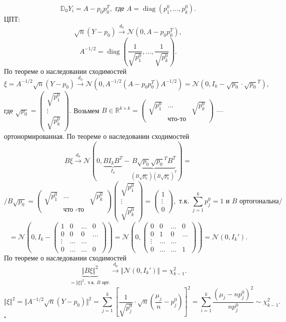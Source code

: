 \documentclass[12pt]{report}
\DeclareMathOperator{\diag}{diag}
\renewenvironment{proof}{{\bfseries Доказательство:}}{$\square$\\\\}
\theoremstyle{definition}
\begin{document}
\begin{proof}
	$$\mathbb{D}_0 Y_i = A - p_0p_0^T, \text{ где } A = \diag(p_1^0, \ldots, p_k^0).$$
	ЦПТ:
	$$\sqrt{n}(Y - p_0) \xrightarrow{d_0} \mathcal{N}(0, A - p_0p_0^T),$$
	$$A^{-1/2} = \diag\left(\dfrac{1}{\sqrt{p_1^0}}, \ldots, \dfrac{1}{\sqrt{p_k^0}} \right).$$
	По теореме о наследовании сходимостей
	$$\xi = A^{-1/2}\sqrt{n}(Y - p_0) \xrightarrow{d_0} \mathcal{N}(0, A^{-1/2}(A - p_0p_0^T)A^{-1/2}) = \mathcal{N}(0, I_k - \sqrt{p_0}\cdot\sqrt{p_0}^T),$$
	где $\sqrt{p_0} = \begin{pmatrix}
		\sqrt{p_1^0} \\
		\vdots \\
		\sqrt{p_k^0}
	\end{pmatrix}.$ Возьмем $B \in \mathbb{R}^{k \times k} = \begin{pmatrix}
		\sqrt{p_1^0} & \ldots & \sqrt{p_k^0}\\
		& \text{что-то} &
	\end{pmatrix}$ — ортонормированная. По теореме о наследовании сходимостей
	$$B\xi \xrightarrow{d_0} \mathcal{N}(0, \underbrace{BI_kB^T}_{I_k} - \underbrace{B\sqrt{p_0}\sqrt{p_0}^TB^T}_{(B\sqrt{p_0})(B\sqrt{p_0})^T}) = $$
	$$/ B\sqrt{p_0} = \begin{pmatrix}
		\sqrt{p_1^0} & \ldots & \sqrt{p_k^0}\\
		& \text{что -то} &
	\end{pmatrix}\begin{pmatrix}
		\sqrt{p_1^0} \\
		\vdots \\
		\sqrt{p_k^0}
	\end{pmatrix} =
	\begin{pmatrix}
		1 \\
		\vdots \\
		0
	\end{pmatrix}, \text{ т.к. } \displaystyle{\sum_{j=1}^k}p_j^0 = 1\text{ и } B \text{ ортогональна}/$$
	$$= 
	\mathcal{N}\left(0, I_k - \begin{pmatrix}
		1 & 0 & \ldots & 0 \\
		0 & 0 & 0 & \ldots \\
		\vdots & \dots & \dots & \\
		0 & \dots & \dots & 0
	\end{pmatrix}\right) = 
	\mathcal{N}\left(0,  \begin{pmatrix}
		0 & 0 & \ldots & 0 \\
		0 & 1 & 0 & \ldots \\
		\vdots & \dots & \dots & \\
		0 & \dots & \dots & 1
	\end{pmatrix}\right) = \mathcal{N}(0, I_k').$$
	 По теореме о наследовании сходимостей
		$$\underbrace{\Vert B\xi \Vert^2}_{= \Vert \xi \Vert^2, \text{ т.к. } B \text{ орт.}} \xrightarrow{d_0} \Vert \mathcal{N}(0, I_k')\Vert = \chi^2_{k-1}.$$
		$$\Vert \xi \Vert^2 = \Vert A^{-1/2} \sqrt{n}(Y - p_0)\Vert^2 = \displaystyle{\sum_{j=1}^k}\left[\dfrac{1}{\sqrt{p_j^0}} \cdot \sqrt{n}\left(\dfrac{\mu_j}{n} - p_j^0\right)\right]^2 = \displaystyle{\sum_{i=1}^k}\dfrac{(\mu_j - np_j^0)^2}{np_j^0} \sim \chi^2_{k-1}.$$
		$$$$
\end{proof}
\end{document}
